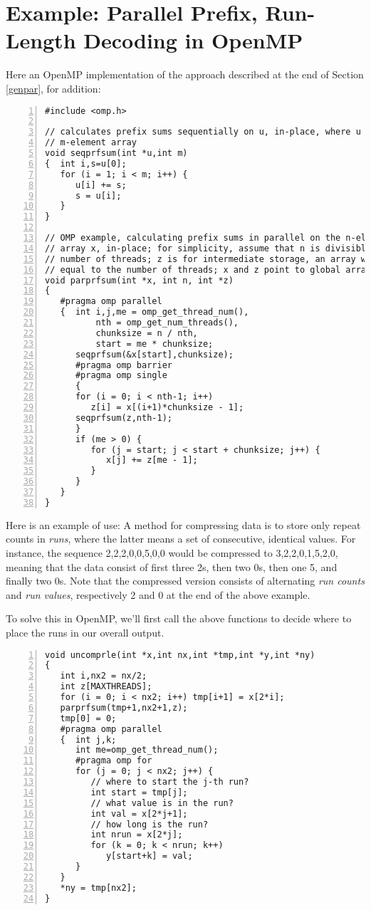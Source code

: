 \section{Example:  Parallel Prefix, Run-Length Decoding in OpenMP}  

Here an OpenMP implementation of the approach described at the end of
Section \ref{genpar}, for addition:

\begin{lstlisting}[numbers=left]
#include <omp.h>

// calculates prefix sums sequentially on u, in-place, where u is an 
// m-element array
void seqprfsum(int *u,int m)
{  int i,s=u[0];
   for (i = 1; i < m; i++) {
      u[i] += s;
      s = u[i];
   }
}

// OMP example, calculating prefix sums in parallel on the n-element
// array x, in-place; for simplicity, assume that n is divisible by the
// number of threads; z is for intermediate storage, an array with length
// equal to the number of threads; x and z point to global arrays
void parprfsum(int *x, int n, int *z)
{
   #pragma omp parallel
   {  int i,j,me = omp_get_thread_num(),
          nth = omp_get_num_threads(),
          chunksize = n / nth,
          start = me * chunksize;
      seqprfsum(&x[start],chunksize);
      #pragma omp barrier
      #pragma omp single
      {
      for (i = 0; i < nth-1; i++)
         z[i] = x[(i+1)*chunksize - 1];
      seqprfsum(z,nth-1);
      }
      if (me > 0) {
         for (j = start; j < start + chunksize; j++) {
            x[j] += z[me - 1];
         }
      }
   }
}
\end{lstlisting}

Here is an example of use:  A method for compressing data is to store
only repeat counts in {\it runs}, where the latter means a set of
consecutive, identical values.  For instance, the sequence
2,2,2,0,0,5,0,0 would be compressed to 3,2,2,0,1,5,2,0, meaning that the
data consist of first three 2s, then two 0s, then one 5, and finally two
0s.  Note that the compressed version consists of alternating {\it run
counts} and {\it run values}, respectively 2 and 0 at the end of the
above example.

To solve this in OpenMP, we'll first call the above functions to decide
where to place the runs in our overall output.

\begin{lstlisting}[numbers=left]
void uncomprle(int *x,int nx,int *tmp,int *y,int *ny)
{
   int i,nx2 = nx/2;
   int z[MAXTHREADS];
   for (i = 0; i < nx2; i++) tmp[i+1] = x[2*i]; 
   parprfsum(tmp+1,nx2+1,z);
   tmp[0] = 0;
   #pragma omp parallel
   {  int j,k;
      int me=omp_get_thread_num();  
      #pragma omp for
      for (j = 0; j < nx2; j++) {
         // where to start the j-th run?
         int start = tmp[j];
         // what value is in the run?
         int val = x[2*j+1];
         // how long is the run?
         int nrun = x[2*j];
         for (k = 0; k < nrun; k++) 
            y[start+k] = val;
      }
   }
   *ny = tmp[nx2];
}
\end{lstlisting}

